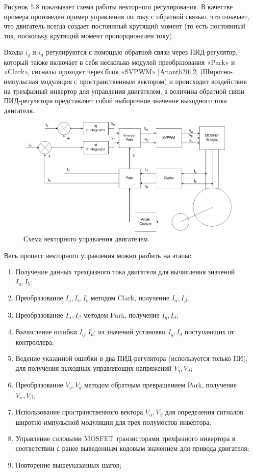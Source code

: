 Рисунок 5.8 показывает схема работы векторного регулирования. В качестве примера произведен пример управления по току с обратной связью, что означает, что двигатель всегда создает постоянный крутящий момент (то есть постоянный ток, поскольку крутящий момент пропорционален току).

Входы $i_q$ и $i_d$ регулируются с помощью обратной связи через ПИД-регулятор, который также включает в себя несколько модулей преобразования «Park» и «Clark», сигналы проходят через блок «SVPWM» \ref{Ananth2012} (Широтно-импульсная модуляция с пространственным вектором) и происходит воздействие на трехфазный инвертор для управления двигателем, а величина обратной связи ПИД-регулятора представляет собой выборочное значение выходного тока двигателя.

\begin{figure}[H]
	\centering
	\includegraphics[width=\textwidth]{Src/images/FOC maindrawio.png}
	\caption{Схема векторного управления двигателем.}
	\label{ACDFOCALG}
\end{figure}


Весь процесс векторного управления можно разбить на этапы:
\begin{enumerate}
	\item Получение данных трехфазного тока двигателя для вычисления значений $I_a,I_b$;
	\item Преобразование $I_a,I_b,I_c$ методом Clark, получение $I_\alpha,I_\beta$;
	\item Преобразование $I_\alpha,I_\beta$ методом Park, получение $I_q,I_d$;
	\item Вычисление ошибки $I_q,I_d$; из значений установки $I_q,I_d$ поступающих от контроллера;
	\item Ведение указанной ошибки в два ПИД-регулятора (используется только ПИ), для получения выходных управляющих напряжений $V_q,V_d$;
	\item Преобразование $V_q,V_d$ методом обратным превращением Park, получение $V_\alpha,V_\beta$;
	\item Использование пространственного вектора $V_\alpha,V_\beta$ для определения сигналов широтно-импульсной модуляции для трех полумостов инвертора;
	\item Управление силовыми MOSFET транзисторами трехфазного инвертора в соответствии с ранее выведенным кодовым значением для привода двигателя;
	\item Повторение вышеуказанных шагов;
\end{enumerate}

